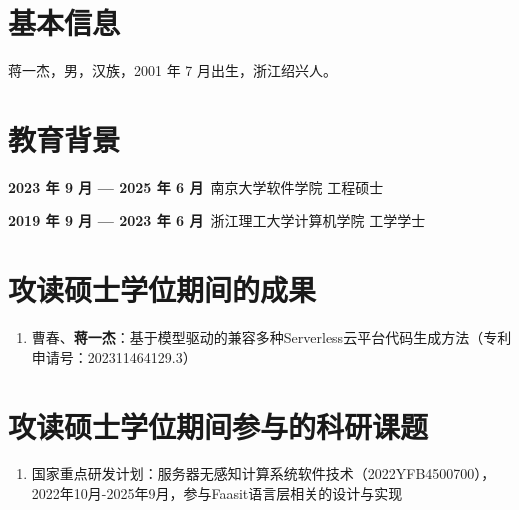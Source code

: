 \documentclass[
    decl-page,  %
    type = master,
    degree = professional,
  ]{njuthesis}
\begin{document}





\section*{基本信息}
\noindent 蒋一杰，男，汉族，2001 年 7 月出生，浙江绍兴人。

\section*{教育背景}

\noindent \textbf{2023 年 9 月 — 2025 年 6 月}~南京大学软件学院 \hfill 工程硕士

\noindent \textbf{2019 年 9 月 — 2023 年 6 月}~浙江理工大学计算机学院 \hfill 工学学士

\section*{攻读硕士学位期间的成果}
\begin{enumerate}[label=\arabic*., labelindent=0em, leftmargin=*]
    \item 曹春、\textbf{蒋一杰}：基于模型驱动的兼容多种Serverless云平台代码生成方法（专利申请号：202311464129.3）
\end{enumerate}

\section*{攻读硕士学位期间参与的科研课题}
\begin{enumerate}[label=\arabic*., labelindent=0em, leftmargin=*]
    \item 国家重点研发计划：服务器无感知计算系统软件技术（2022YFB4500700），2022年10月-2025年9月，参与Faasit语言层相关的设计与实现
\end{enumerate}




\end{document}
